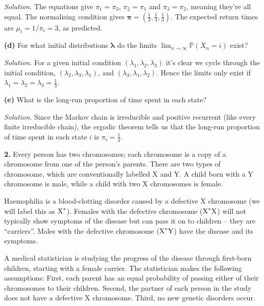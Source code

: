 \documentclass[
  a4paper,
]{article}
\theoremstyle{definition}
\theoremstyle{definition}
\theoremstyle{definition}
\theoremstyle{remark}
\begin{document}
\begin{myanswers}
\emph{Solution.}
The equations give \(\pi_1 = \pi_3\), \(\pi_2 = \pi_1\) and \(\pi_3 = \pi_2\), meaning they're all equal. The normalising condition gives \(\boldsymbol\pi = (\frac13, \frac13, \frac13)\). The expected return times are \(\mu_i = 1/\pi_i = 3\), as predicted.

\end{myanswers}

\textbf{(d)} For what initial distributions \(\boldsymbol\lambda\) do the limits \(\lim_{n \to \infty} \mathbb P(X_n = i)\) exist?

\begin{myanswers}
\emph{Solution.}
For a given initial condition \((\lambda_1, \lambda_2, \lambda_3)\) it's clear we cycle through the initial condition, \((\lambda_2, \lambda_3, \lambda_1)\), and \((\lambda_3, \lambda_1, \lambda_2)\). Hence the limits only exist if \(\lambda_1 = \lambda_2 = \lambda_3 = \frac13\).

\end{myanswers}

\textbf{(e)} What is the long-run proportion of time spent in each state?

\begin{myanswers}
\emph{Solution.}
Since the Markov chain is irreducible and positive recurrent (like every finite irreducible chain), the ergodic theorem tells us that the long-run proportion of time spent in each state \(i\) is \(\pi_i = \frac13\).

\end{myanswers}

\textbf{2.} Every person has two chromosomes; each chromosome is a copy of a chromosome from one of the person's parents. There are two types of chromosome, which are conventionally labelled X and Y. A child born with a Y chromosome is male, while a child with two X chromosomes is female.

Haemophilia is a blood-clotting disorder caused by a defective X chromosome (we will label this as \(\text X^*\)). Females with the defective chromosome (\(\text X^*\text X\)) will not typically show symptoms of the disease but can pass it on to children -- they are ``carriers''. Males with the defective chromosome (\(\text X^* \text Y\)) have the disease and its symptoms.

A medical statistician is studying the progress of the disease through first-born children, starting with a female carrier. The statistician makes the following assumptions: First, each parent has an equal probability of passing either of their chromosomes to their children. Second, the partner of each person in the study does not have a defective X chromosome. Third, no new genetic disorders occur.
\end{document}
